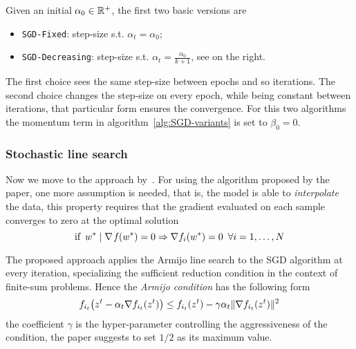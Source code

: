 Given an initial $\alpha_0\in\mathbb{R}^+$, the first two basic versions are 
\begin{itemize}
\item \texttt{SGD-Fixed}: step-size s.t. $\alpha_t=\alpha_0$;
\item \texttt{SGD-Decreasing}: step-size s.t. $\alpha_t=\frac{\alpha_0}{k+1}$, see on the right.
\end{itemize}
The first choice sees the same step-size between epochs and so iterations. The second choice changes the step-size on every epoch, while being constant between iterations, that particular form ensures the convergence. For this two algorithms the momentum term in algorithm~\ref{alg:SGD-variants} is set to $\beta_0=0$.


\subsubsection{Stochastic line search}

Now we move to the approach by~\textcite{vaswani_painless_2019}. For using the algorithm proposed by the paper, one more assumption is needed, that is, the model is able to \emph{interpolate} the data, this property requires that the gradient evaluated on each sample converges to zero at the optimal solution
\[
\text{if}\,\,\,w^\ast\mid\nabla\operatorname*{\mathit{f}}(w^\ast)=0\Rightarrow\nabla f_i(w^\ast)=0\,\,\,\forall i=1,\dots,N
\]

The proposed approach applies the Armijo line search to the SGD algorithm at every iteration, specializing the sufficient reduction condition in the context of finite-sum problems. Hence the \emph{Armijo condition} has the following form
\begin{equation}\label{eq:mini-armijo}
f_{i_t}\bigl(z^t-\alpha_t\nabla f_{i_t}(z^t)\bigr)\leq f_{i_t}(z^t)-\gamma\alpha_t\lVert\nabla f_{i_t}(z^t)\rVert^2
\end{equation}
the coefficient $\gamma$ is the hyper-parameter controlling the aggressiveness of the condition, the paper suggests to set $1/2$ as its maximum value.

